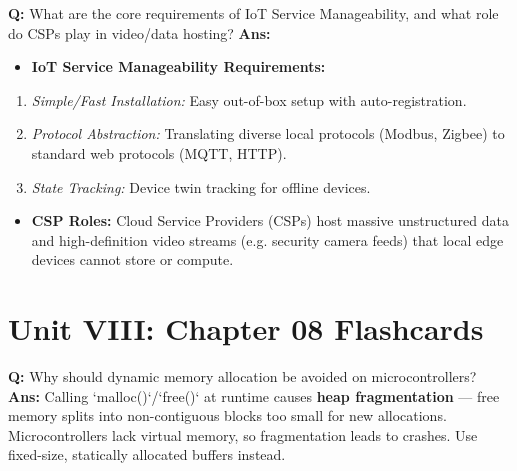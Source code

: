 \documentclass[10pt,a4paper,twocolumn]{article}
\begin{document}
\begin{tcolorbox}[
  colback=white,
  colframe=UnitColorSeven,
  colbacktitle=gray!10!white,
  coltitle=black,
  fonttitle=\bfseries\sffamily\small,
  title={Unit VII $\bullet$ Card 11},
  boxrule=1.2pt,
  arc=2mm,
  outer arc=2mm,
  boxsep=1.5mm,
  top=1mm,
  bottom=1mm,
  left=1.5mm,
  right=1.5mm,
  before skip=2.5mm,
  after skip=2.5mm
]
\textbf{Q:} What are the core requirements of IoT Service Manageability, and what role do CSPs play in video/data hosting?
\tcbline
\textbf{Ans:} \begin{itemize}
  \item \textbf{IoT Service Manageability Requirements:}
\end{itemize}
\begin{enumerate}
  \item \textit{Simple/Fast Installation:} Easy out-of-box setup with auto-registration.
  \item \textit{Protocol Abstraction:} Translating diverse local protocols (Modbus, Zigbee) to standard web protocols (MQTT, HTTP).
  \item \textit{State Tracking:} Device twin tracking for offline devices.
\end{enumerate}
\begin{itemize}
  \item \textbf{CSP Roles:} Cloud Service Providers (CSPs) host massive unstructured data and high-definition video streams (e.g. security camera feeds) that local edge devices cannot store or compute.
\end{itemize}
\end{tcolorbox}

\section*{Unit VIII: Chapter 08 Flashcards}

\begin{tcolorbox}[
  colback=white,
  colframe=UnitColorEight,
  colbacktitle=gray!10!white,
  coltitle=black,
  fonttitle=\bfseries\sffamily\small,
  title={Unit VIII $\bullet$ Card 1},
  boxrule=1.2pt,
  arc=2mm,
  outer arc=2mm,
  boxsep=1.5mm,
  top=1mm,
  bottom=1mm,
  left=1.5mm,
  right=1.5mm,
  before skip=2.5mm,
  after skip=2.5mm
]
\textbf{Q:} Why should dynamic memory allocation be avoided on microcontrollers?
\tcbline
\textbf{Ans:} Calling `malloc()`/`free()` at runtime causes \textbf{heap fragmentation} — free memory splits into non-contiguous blocks too small for new allocations. Microcontrollers lack virtual memory, so fragmentation leads to crashes. Use fixed-size, statically allocated buffers instead.
\end{tcolorbox}
\end{document}
